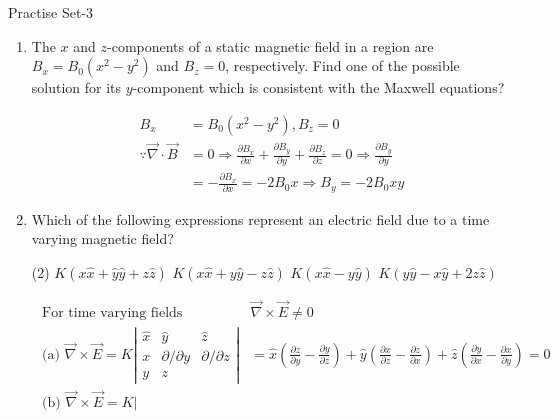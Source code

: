 






\newpage
\begin{abox}
	Practise Set-3
\end{abox}
\begin{enumerate}
	\item 	The $x$ and $z$-components of a static magnetic field in a region are $B_{x}=B_{0}\left(x^{2}-y^{2}\right)$ and $B_{z}=0$, respectively. Find one of the possible solution for its $y$-component which is consistent with the Maxwell equations?
	\begin{answer}
		\begin{align*}
		 B_{x}&=B_{0}\left(x^{2}-y^{2}\right), B_{z}=0\\
		\because \vec{\nabla} \cdot \vec{B}&=0 \Rightarrow \frac{\partial B_{x}}{\partial x}+\frac{\partial B_{y}}{\partial y}+\frac{\partial B_{z}}{\partial z}=0 \Rightarrow \frac{\partial B_{y}}{\partial y}\\&=-\frac{\partial B_{x}}{\partial x}=-2 B_{0} x \Rightarrow B_{y}=-2 B_{0} x y
		\end{align*}
	\end{answer}
	\item 	Which of the following expressions represent an electric field due to a time varying magnetic field?
	\begin{tasks}(2)
		\task[\textbf{a.}]$K(x \hat{x}+\hat{y} \hat{y}+z \hat{z})$
		\task[\textbf{b.}]$K(x \hat{x}+y \hat{y}-z \hat{z})$
		\task[\textbf{c.}] $K(x \hat{x}-y \hat{y})$
		\task[\textbf{d.}] $K(y \hat{y}-x \hat{y}+2 z \hat{z})$
	\end{tasks}
\begin{answer}
	\begin{align*}
	\text { For time varying fields } &\vec{\nabla} \times \vec{E} \neq 0\\
	\text { (a) } \vec{\nabla} \times \vec{E}=K\left|\begin{array}{ccc}
	\hat{x} & \hat{y} & \hat{z} \\
	x & \partial / \partial y & \partial / \partial z \\
	y & z
	\end{array}\right|&=\hat{x}\left(\frac{\partial z}{\partial y}-\frac{\partial y}{\partial z}\right)+\hat{y}\left(\frac{\partial x}{\partial z}-\frac{\partial z}{\partial x}\right)+\hat{z}\left(\frac{\partial y}{\partial x}-\frac{\partial x}{\partial y}\right)=0\\
	\text { (b) } \vec{\nabla} \times \vec{E}=K\left|\begin{array}{ccc}

\end{array}
\end{align*}
\end{answer}
\end{enumerate}
